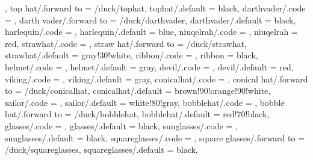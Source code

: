 {                              \def\duck@tophat{#1},
  top hat/.forward to       = /duck/tophat,
  tophat/.default           = black,
  darthvader/.code          = \duck@darthvadertrue  
                              \def\duck@darthvader{#1},
  darth vader/.forward to   = /duck/darthvader,
  darthvader/.default       = black,
  harlequin/.code           = \duck@harlequintrue   
                              \def\duck@harlequin{#1},
  harlequin/.default        = blue,
  niuqelrah/.code           = \def\duck@niuqelrah{#1},
  niuqelrah                 = red,
  strawhat/.code            = \duck@strawhattrue    
                              \def\duck@strawhat{#1},
  straw hat/.forward to     = /duck/strawhat,
  strawhat/.default         = gray!30!white,
  ribbon/.code              = \def\duck@ribbon{#1},
  ribbon                    = black,
  helmet/.code              = \duck@helmettrue      
                              \def\duck@helmet{#1},
  helmet/.default           = gray,
  devil/.code               = \duck@deviltrue
                              \def\duck@devil{#1},
  devil/.default            = red,
  viking/.code              = \duck@vikingtrue      
                              \def\duck@viking{#1}
                              \duck@deviltrue
                              \def\duck@devil{brown!20!white},
  viking/.default           = gray,  
  conicalhat/.code          = \duck@conicalhattrue
                              \def\duck@conicalhat{#1},
  conical hat/.forward to   = /duck/conicalhat,                  
  conicalhat/.default       = brown!90!orange!90!white,
  sailor/.code              = \duck@sailortrue
                              \def\duck@sailor{#1},
  sailor/.default           = white!80!gray,
  bobblehat/.code           = \duck@bobblehattrue
                              \def\duck@bobblehat{#1},
  bobble hat/.forward to    = /duck/bobblehat,
  bobblehat/.default        = red!70!black,  
  glasses/.code             = \duck@glassestrue     
                              \def\duck@glasses{#1},
  glasses/.default          = black,
  sunglasses/.code          = \duck@sunglassestrue  
                              \def\duck@sunglasses{#1},
  sunglasses/.default       = black, 
  squareglasses/.code       = \duck@squareglassestrue 
                              \def\duck@squareglasses{#1},
  square glasses/.forward to = /duck/squareglasses,
  squareglasses/.default    = black,
}

